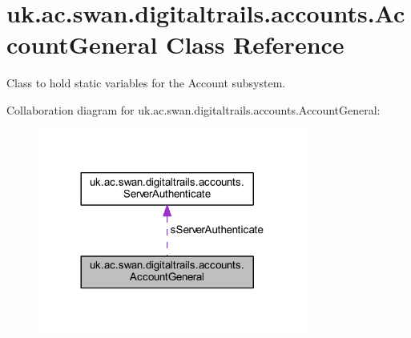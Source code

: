 \hypertarget{classuk_1_1ac_1_1swan_1_1digitaltrails_1_1accounts_1_1_account_general}{\section{uk.\+ac.\+swan.\+digitaltrails.\+accounts.\+Account\+General Class Reference}
\label{classuk_1_1ac_1_1swan_1_1digitaltrails_1_1accounts_1_1_account_general}
}


Class to hold static variables for the Account subsystem.  




Collaboration diagram for uk.\+ac.\+swan.\+digitaltrails.\+accounts.\+Account\+General\+:\nopagebreak
\begin{figure}[H]
\begin{center}
\leavevmode
\includegraphics[width=252pt]{classuk_1_1ac_1_1swan_1_1digitaltrails_1_1accounts_1_1_account_general__coll__graph}
\end{center}
\end{figure}
